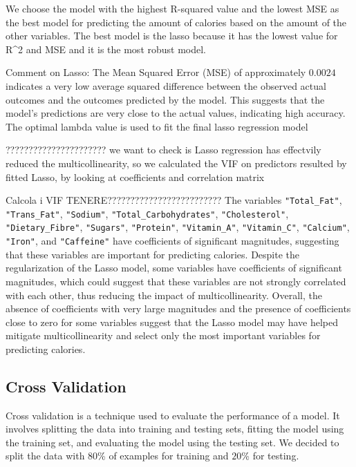 \documentclass[
]{article}
\begin{document}
We choose the model with the highest R-squared value and the lowest MSE
as the best model for predicting the amount of calories based on the
amount of the other variables. The best model is the lasso because it
has the lowest value for R\^{}2 and MSE and it is the most robust model.

Comment on Lasso: The Mean Squared Error (MSE) of approximately
\(0.0024\) indicates a very low average squared difference between the
observed actual outcomes and the outcomes predicted by the model. This
suggests that the model's predictions are very close to the actual
values, indicating high accuracy. The optimal lambda value is used to
fit the final lasso regression model

?????????????????????? we want to check is Lasso regression has
effectvily reduced the multicollinearity, so we calculated the VIF on
predictors resulted by fitted Lasso, by looking at coefficients and
correlation matrix

Calcola i VIF TENERE????????????????????????? The variables
\texttt{"Total\_Fat"}, \texttt{"Trans\_Fat"}, \texttt{"Sodium"},
\texttt{"Total\_Carbohydrates"}, \texttt{"Cholesterol"},
\texttt{"Dietary\_Fibre"}, \texttt{"Sugars"}, \texttt{"Protein"},
\texttt{"Vitamin\_A"}, \texttt{"Vitamin\_C"}, \texttt{"Calcium"},
\texttt{"Iron"}, and \texttt{"Caffeine"} have coefficients of
significant magnitudes, suggesting that these variables are important
for predicting calories. Despite the regularization of the Lasso model,
some variables have coefficients of significant magnitudes, which could
suggest that these variables are not strongly correlated with each
other, thus reducing the impact of multicollinearity. Overall, the
absence of coefficients with very large magnitudes and the presence of
coefficients close to zero for some variables suggest that the Lasso
model may have helped mitigate multicollinearity and select only the
most important variables for predicting calories.

\subsection{Cross Validation}\label{cross-validation}

Cross validation is a technique used to evaluate the performance of a
model. It involves splitting the data into training and testing sets,
fitting the model using the training set, and evaluating the model using
the testing set. We decided to split the data with \(80\)\% of examples
for training and \(20\)\% for testing.
\end{document}
